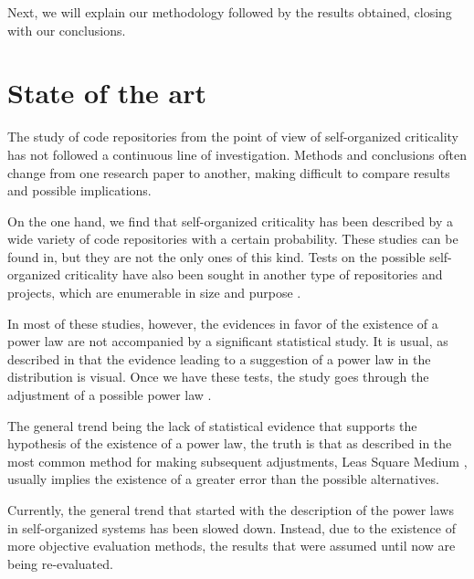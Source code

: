 \documentclass{article}
\begin{document}

Next, we will explain our methodology followed by the results
obtained, closing with our conclusions.



\section{State of the art}\label{soa}

The study of code repositories from the point of view of
self-organized criticality has not followed a continuous line of
investigation. Methods and conclusions often change from one research paper to another,
making difficult to compare results and possible implications. %

On the one hand, we find that self-organized criticality has been
described by a wide variety of code repositories with a certain
probability. These studies can be found
in\cite{wu2007empirical,gorshenev2004punctuated}, but they are not the
only ones of this kind. Tests on the possible self-organized
criticality have also been sought in another type of repositories and
projects, which are enumerable in size and purpose
\cite{Merelo2016:repomining,merelo16:slash,merelo16:self,merelo2017self}.

In most of these studies, however, the evidences in favor of the
existence of a power law are not accompanied by a significant
statistical study. It is usual, as described in \cite{newman2005power}
that the evidence leading to a suggestion of a power law in the
distribution is visual. Once we have these tests, the study goes
through the adjustment of a possible power law
\cite{merelo2017self,arafat2009commit}.

The general trend being the lack of statistical evidence that supports
the hypothesis of the existence of a power law, the truth is that as
described in \cite{newman2005power, clauset2009power} the most common
method for making subsequent adjustments, Leas Square Medium
\cite{merelo2017self,arafat2009commit,merelo16:self}, usually implies
the existence of a greater error than the possible alternatives.

Currently, the general trend that started with the description of the
power laws in self-organized systems has been slowed down. Instead,
due to the existence of more objective evaluation methods, the results
that were assumed until now are being re-evaluated.
\end{document}

